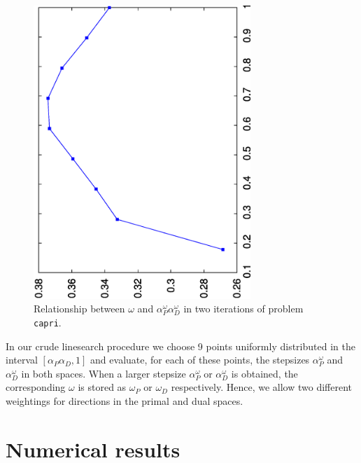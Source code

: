 \begin{figure}[ht]
\begin{minipage}[t]{0.49\textwidth}
  \includegraphics[width=0.73\textwidth,angle=-90]{figures/alphaomega-2.eps}
  \end{minipage}
  \caption{Relationship between $\omega$ and $\alpha^\omega_P\alpha^\omega_D$
           in two iterations of problem {\tt capri}.}
  \label{fig:alphaomega}
\end{figure}

In our crude linesearch procedure we choose 9 points uniformly 
distributed in the interval $[\alpha_P\alpha_D, 1]$ 
and evaluate, for each of these points, the stepsizes 
$\alpha^\omega_P$ and $\alpha^\omega_D$ in both spaces. 
When a larger stepsize $\alpha^\omega_P$ or $\alpha^\omega_D$ is obtained, 
the corresponding $\omega$ is stored as $\omega_P$ or $\omega_D$ 
respectively. Hence, we allow two different weightings for directions 
in the primal and dual spaces.

%
%
\section{Numerical results}
\label{sec:NumericalResults}

